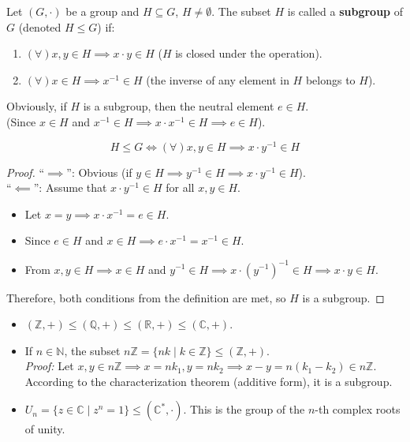\begin{definition}
Let $(G, \cdot)$ be a group and $H \subseteq G$, $H \neq \emptyset$. The subset $H$ is called a \textbf{subgroup} of $G$ (denoted $H \le G$) if:
\begin{enumerate}
    \item $(\forall) x, y \in H \implies x \cdot y \in H$ ($H$ is closed under the operation).
    \item $(\forall) x \in H \implies x^{-1} \in H$ (the inverse of any element in $H$ belongs to $H$).
\end{enumerate}
\end{definition}

\begin{remark}
Obviously, if $H$ is a subgroup, then the neutral element $e \in H$. \\
(Since $x \in H$ and $x^{-1} \in H \implies x \cdot x^{-1} \in H \implies e \in H$).
\end{remark}

\begin{theorem}
$$ H \le G \iff (\forall) x, y \in H \implies x \cdot y^{-1} \in H $$
\end{theorem}

\begin{proof}
``$\implies$'': Obvious (if $y \in H \implies y^{-1} \in H \implies x \cdot y^{-1} \in H$). \\
``$\impliedby$'': Assume that $x \cdot y^{-1} \in H$ for all $x, y \in H$.
\begin{itemize}
    \item Let $x = y \implies x \cdot x^{-1} = e \in H$.
    \item Since $e \in H$ and $x \in H \implies e \cdot x^{-1} = x^{-1} \in H$.
    \item From $x, y \in H \implies x \in H$ and $y^{-1} \in H \implies x \cdot (y^{-1})^{-1} \in H \implies x \cdot y \in H$.
\end{itemize}
Therefore, both conditions from the definition are met, so $H$ is a subgroup.
\end{proof}

\begin{example}\leavevmode
\begin{itemize}
    \item $(\mathbb{Z}, +) \le (\mathbb{Q}, +) \le (\mathbb{R}, +) \le (\mathbb{C}, +)$.
    \item If $n \in \mathbb{N}$, the subset $n\mathbb{Z} = \{nk \mid k \in \mathbb{Z}\} \le (\mathbb{Z}, +)$. \\
    \textit{Proof:} Let $x, y \in n\mathbb{Z} \implies x = nk_1, y = nk_2 \implies x - y = n(k_1 - k_2) \in n\mathbb{Z}$. According to the characterization theorem (additive form), it is a subgroup.
    \item $U_n = \{z \in \mathbb{C} \mid z^n = 1\} \le (\mathbb{C}^*, \cdot)$. This is the group of the $n$-th complex roots of unity.
\end{itemize}
\end{example}

